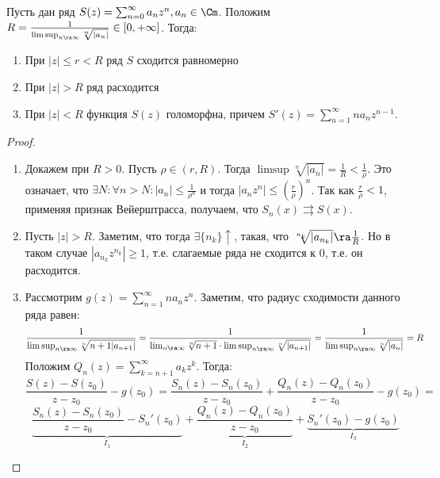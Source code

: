 \begin{theorem}
    Пусть дан ряд \(S(z) = \sum_{n = 0}^\infty a_nz^n, a_n \in \Cm\). Положим \(R = \frac{1}{\limsup_{n \ra \infty} \sqrt[n]{|a_n|}} \in [0, +\infty]\). Тогда:
    \begin{enumerate}
        \item При \(|z| \le r < R\) ряд \(S\) сходится равномерно
        \item При \(|z| > R\) ряд расходится
        \item При \(|z| < R\) функция \(S(z)\) голоморфна, причем \(S'(z) = \sum_{n = 1}^\infty na_nz^{n - 1}\).
    \end{enumerate}
\end{theorem}
\begin{proof}
    \begin{enumerate}
        \item Докажем при \(R > 0\). Пусть \(\rho \in (r, R)\). Тогда \(\limsup \sqrt[n]{|a_n|} = \frac{1}{R} < \frac{1}{\rho}\). Это означает, что \(\exists N: \forall n > N: |a_n| \le \frac{1}{\rho^n}\) и тогда \(|a_nz^n| \le \left( \frac{r}{\rho} \right)^n\). Так как \(\frac{r}{\rho} < 1\), применяя признак Вейерштрасса, получаем, что \(S_n(x) \rightrightarrows S(x)\).
        \item Пусть \(|z| > R\). Заметим, что тогда \(\exists \{n_k\} \uparrow\), такая, что \(\sqrt[n_k]{|a_{n_k}|} \ra \frac{1}{R}\). Но в таком случае \(|a_{n_k}z^{n_k}| \ge 1\), т.е. слагаемые ряда не сходится к 0, т.е. он расходится.
        \item Рассмотрим \(g(z) = \sum_{n = 1}^\infty na_nz^n\). Заметим, что радиус сходимости данного ряда равен: \[\frac{1}{\limsup_{n \ra \infty}\sqrt[n]{n + 1|a_{n + 1}|}} = \frac{1}{\lim_{n \ra \infty} \sqrt[n]{n + 1}\cdot\limsup_{n \ra \infty}\sqrt[n]{|a_{n + 1}|}} = \frac{1}{\limsup_{n \ra \infty} \sqrt[n]{|a_n|}} = R\]
        Положим \(Q_n(z) = \sum_{k = n + 1}^\infty a_kz^k\). Тогда:
        \[\frac{S(z) - S(z_0)}{z - z_0} - g(z_0) = \frac{S_n(z) - S_n(z_0)}{z - z_0} + \frac{Q_n(z) - Q_n(z_0)}{z - z_0} - g(z_0) =\]
        \[\underbrace{\frac{S_n(z) - S_n(z_0)}{z - z_0} - S_n'(z_0)}_{I_1} + \underbrace{\frac{Q_n(z) - Q_n(z_0)}{z - z_0}}_{I_2} + \underbrace{S_n'(z_0) - g(z_0)}_{I_3}\]


\end{enumerate}
\end{proof}
